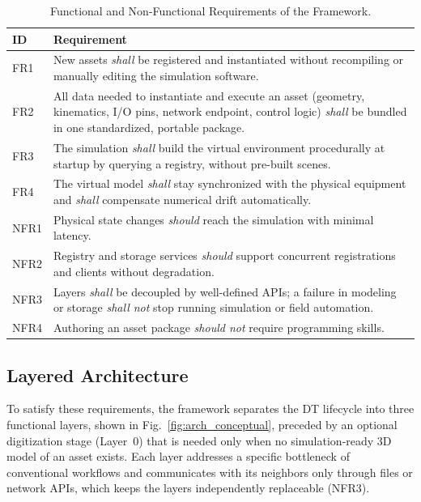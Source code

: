 \documentclass{ieeeojies}
\begin{document}
\begin{table}[t]
\centering
\caption{Functional and Non-Functional Requirements of the Framework.}
\label{tab:requirements}
\renewcommand{\arraystretch}{1.2}
\footnotesize
\begin{tabularx}{\columnwidth}{@{}lX@{}}
\toprule
\textbf{ID} & \textbf{Requirement} \\
\midrule
FR1  & New assets \textit{shall} be registered and instantiated without recompiling or manually editing the simulation software. \\
FR2  & All data needed to instantiate and execute an asset (geometry, kinematics, I/O pins, network endpoint, control logic) \textit{shall} be bundled in one standardized, portable package. \\
FR3  & The simulation \textit{shall} build the virtual environment procedurally at startup by querying a registry, without pre-built scenes. \\
FR4  & The virtual model \textit{shall} stay synchronized with the physical equipment and \textit{shall} compensate numerical drift automatically. \\
NFR1 & Physical state changes \textit{should} reach the simulation with minimal latency. \\
NFR2 & Registry and storage services \textit{should} support concurrent registrations and clients without degradation. \\
NFR3 & Layers \textit{shall} be decoupled by well-defined APIs; a failure in modeling or storage \textit{shall not} stop running simulation or field automation. \\
NFR4 & Authoring an asset package \textit{should not} require programming skills. \\
\bottomrule
\end{tabularx}
\end{table}

\subsection{Layered Architecture}
\label{sec:arch_overview}

To satisfy these requirements, the framework separates the DT lifecycle into three functional layers, shown in Fig.~\ref{fig:arch_conceptual}, preceded by an optional digitization stage (Layer~0) that is needed only when no simulation-ready 3D model of an asset exists. Each layer addresses a specific bottleneck of conventional workflows and communicates with its neighbors only through files or network APIs, which keeps the layers independently replaceable (NFR3).
\end{document}
